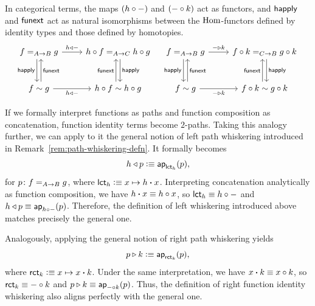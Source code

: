 In categorical terms, the maps $(h\circ{\mathord-})$ and $({\mathord-}\circ k)$ act as functors, and $\mathsf{happly}$ and $\mathsf{funext}$ act as natural isomorphisms between the ${\operatorname{Hom}}$-functors defined by identity types and those defined by homotopies.
\[
    \begin{tikzcd}[row sep=large]
        f\eq{A\to B}g
                \arrow[r,"h\lwct -"]
                \arrow[d,"\fun{happly}"',shift right]
            &h\circ f\eq{A\to C}h\circ g
                \arrow[d,"\fun{happly}",shift left]\\
        f\sim g
                \arrow[r,"h\lwct -"']
                \arrow[u,"\fun{funext}"',shift right]
            &h\circ f\sim h\circ g
                \arrow[u,"\fun{funext}",shift left]
    \end{tikzcd}
    \quad
    \begin{tikzcd}[row sep=large]
        f\eq{A\to B}g
                \arrow[r,"-\rwct k"]
                \arrow[d,"\fun{happly}"',shift right]
            &f\circ k\eq{C\to B}g\circ k
                \arrow[d,"\fun{happly}",shift left]\\
        f\sim g
                \arrow[r,"-\rwct k"']
                \arrow[u,"\fun{funext}"',shift right]
            &f\circ k\sim g\circ k
                \arrow[u,"\fun{funext}",shift left]
    \end{tikzcd}
\]

\begin{rem}
    If we formally interpret functions as paths and function composition as concatenation, function identity terms become\/ $2$-paths. Taking this analogy further, we can apply to it the general notion of left path whiskering introduced in Remark~\ref{rem:path-whiskering-defn}. It formally becomes
    \[
        h\triangleleft p\mathrel{\vcentcolon}\equiv\mathsf{ap}_{\mathsf{lct}_h}(p),
    \]
    for\/ $p\colon f\eq{A\to B}g$, where\/ $\mathsf{lct}_h\mathrel{\vcentcolon}\equiv x\mapsto h\mathbin{\boldsymbol{\cdot}} x$. Interpreting concatenation analytically as function composition, we have\/ $h\mathbin{\boldsymbol{\cdot}} x\equiv h\circ x$, so\/ $\mathsf{lct}_h\equiv h\circ -$ and\/ $h\triangleleft p\equiv\mathsf{ap}_{h\circ -}(p)$. Therefore, the definition of left whiskering introduced above matches precisely the general one.

    Analogously, applying the general notion of right path whiskering yields
    \[
        p\triangleright k\mathrel{\vcentcolon}\equiv\mathsf{ap}_{\mathsf{rct}_k}(p),
    \]
    where\/ $\mathsf{rct}_k\mathrel{\vcentcolon}\equiv x\mapsto x\mathbin{\boldsymbol{\cdot}} k$. Under the same interpretation, we have\/ $x\mathbin{\boldsymbol{\cdot}} k\equiv x\circ k$, so\/ $\mathsf{rct}_k\equiv -\circ k$ and\/ $p\triangleright k\equiv\mathsf{ap}_{-\circ k}(p)$. Thus, the definition of right function identity whiskering also aligns perfectly with the general one.
\end{rem}


